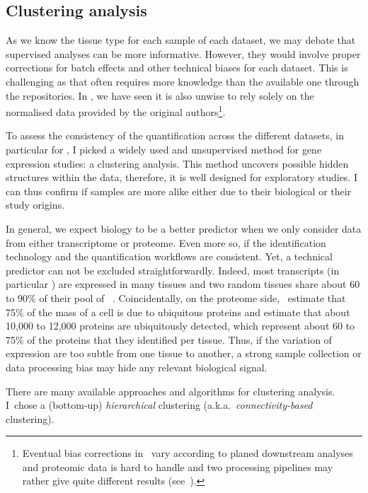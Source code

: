 \subsection{Clustering analysis}

As we know the tissue type for each sample of each dataset,
we may debate that supervised analyses can be more informative.
However, they would involve proper corrections for batch effects and
other technical biases for each dataset.
This is challenging as that often requires more knowledge than the available one
through the repositories.
In , we have seen it is also unwise to rely solely on the
normalised data provided by the original authors\footnote{Eventual bias
corrections in \Rnaseq\ vary according to planed downstream analyses and
proteomic data is hard to handle and two processing pipelines may rather give
quite different results (see~).}.

To assess the consistency of the quantification across the different datasets,
in particular for \Rnaseq,
I picked a widely used and unsupervised method for gene expression studies:
a clustering analysis.
This method uncovers possible hidden
structures within the data, therefore,
it is well designed for exploratory studies.
I can thus confirm if samples are more alike either due to their
biological or their study origins.

In general, we expect biology to be a better predictor when we only consider
data from either transcriptome or proteome. Even more so, if the
identification technology and the quantification workflows are
consistent. Yet, a technical predictor can not be excluded straightforwardly.
Indeed, most transcripts (in particular \mRNAs) are expressed in many tissues
and two random tissues share about 60 to 90\% of their pool of
\mRNAs~.
Coincidentally, on the proteome side,~\cite{PandeyData}
estimate that 75\% of the mass of a cell is due to ubiquitous proteins and
\cite{KusterData} estimate that about 10,000
to 12,000 proteins are ubiquitously detected, which represent about 60 to 75\%
of the proteins that they identified per tissue. Thus, if the variation of
expression are too subtle from one tissue to another, a strong sample collection
or data processing bias may hide any relevant biological signal.

There are many available approaches and algorithms for clustering analysis.
I~chose a (bottom-up) \emph{hierarchical} clustering (a.k.a.\
\emph{connectivity-based} clustering).

